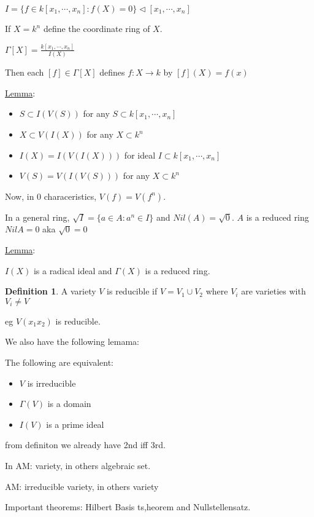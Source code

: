 \documentclass{article}
\theoremstyle{definition}
\newtheorem{definition}{Definition}
\begin{document}
\(I = \{ f\in k[x_1,\cdots, x_n] : f(X) = 0 \} \triangleleft [x_1,\cdots,x_n] \) 

If \(X=k^n\) define the coordinate ring of \(X\).

\(\Gamma[X] = \frac{k[x_1,\cdots, x_n]}{I(X)}\) 

Then each \([f]\in\Gamma[X]\) defines \(f:X\to k\) by \([f](X)=f(x)\) 

\underline{Lemma}:

\begin{itemize}
    \item \(S \subset I(V(S))\) for any \(S \subset k[x_1,\cdots, x_n]\) 
    \item \(X \subset V(I(X))\) for any \(X \subset k^n\) 
    \item \(I(X)=I(V(I(X)))\) for ideal \(I \subset k[x_1,\cdots,x_n]\) 
    \item \(V(S)=V(I(V(S)))\) for any \(X \subset k^n\) 
\end{itemize}

Now, in 0 characeristics, \(V(f)=V(f^n)\).

In a general ring, \(\sqrt{I} = \{ a\in A:a^n\in I \} \) and \(Nil(A) = \sqrt{0}\). \(A\) is a reduced ring \(Nil A = 0\) aka \(\sqrt{0} = 0\) 

\underline{Lemma}:

\(I(X)\) is a radical ideal and \(\Gamma (X)\) is a reduced ring.

\begin{definition}
    A variety \(V\) is reducible if \(V = V_1 \cup V_2\) where \(V_i\) are varieties with \(V_i \neq V\) 
\end{definition}

eg \(V(x_1 x_2 )\) is reducible.

We also have the following lemama:

The following are equivalent:

\begin{itemize}
    \item \(V\) is irreducible
    \item \(\Gamma (V)\) is a domain
    \item \(I(V)\) is a prime ideal
\end{itemize}   

from definiton we already have 2nd iff 3rd.

In AM: variety, in others algebraic set.

AM: irreducible variety, in others variety

Important theorems: Hilbert Basis ts,heorem and Nullstellensatz.
\end{document}
